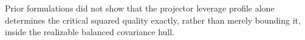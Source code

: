 Prior formulations did not show that the projector leverage profile alone determines the critical squared quality exactly, rather than merely bounding it, inside the realizable balanced covariance hull.
